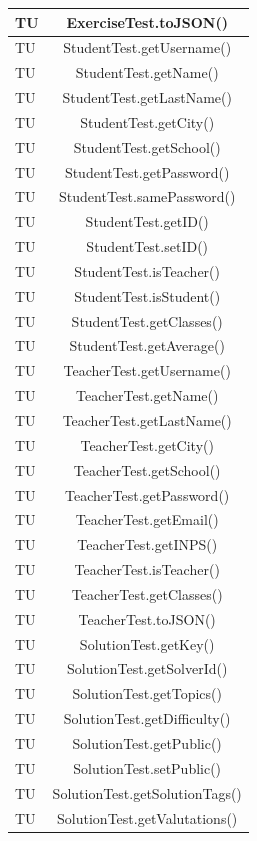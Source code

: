\begin{longtable}{|>{\centering\arraybackslash}m{1.6cm}|c|}
		TU & ExerciseTest.toJSON()\\ \hline
		TU & StudentTest.getUsername() \\ \hline
		TU & StudentTest.getName()\\ \hline
		TU & StudentTest.getLastName() \\ \hline
		TU & StudentTest.getCity() \\ \hline
		TU & StudentTest.getSchool() \\ \hline
		TU & StudentTest.getPassword() \\ \hline
		TU & StudentTest.samePassword()\\ \hline
		TU & StudentTest.getID()\\ \hline
		TU & StudentTest.setID()\\ \hline
		TU & StudentTest.isTeacher() \\ \hline
		TU & StudentTest.isStudent() \\ \hline
		TU & StudentTest.getClasses() \\ \hline
		TU & StudentTest.getAverage()\\ \hline
		TU & TeacherTest.getUsername()\\ \hline
		TU & TeacherTest.getName() \\ \hline
		TU & TeacherTest.getLastName() \\ \hline
		TU & TeacherTest.getCity() \\ \hline
		TU & TeacherTest.getSchool() \\ \hline
		TU & TeacherTest.getPassword() \\ \hline
		TU & TeacherTest.getEmail() \\ \hline
		TU & TeacherTest.getINPS()\\ \hline
		TU & TeacherTest.isTeacher() \\ \hline
		TU & TeacherTest.getClasses() \\ \hline
		TU & TeacherTest.toJSON()\\ \hline
		TU & SolutionTest.getKey()\\ \hline
		TU & SolutionTest.getSolverId()\\ \hline
		TU & SolutionTest.getTopics()\\ \hline
		TU & SolutionTest.getDifficulty()\\ \hline
		TU & SolutionTest.getPublic()\\ \hline
		TU & SolutionTest.setPublic()\\ \hline
		TU & SolutionTest.getSolutionTags()\\ \hline
		TU & SolutionTest.getValutations()\\ \hline

\end{longtable}
